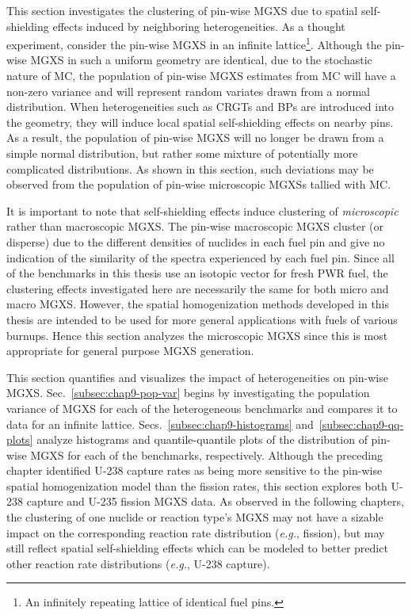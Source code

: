 This section investigates the clustering of pin-wise \ac{MGXS} due to spatial self-shielding effects induced by neighboring heterogeneities. As a thought experiment, consider the pin-wise \ac{MGXS} in an infinite lattice\footnote{An infinitely repeating lattice of identical fuel pins.}. Although the pin-wise \ac{MGXS} in such a uniform geometry are identical, due to the stochastic nature of \ac{MC}, the population of pin-wise \ac{MGXS} estimates from \ac{MC} will have a non-zero variance and will represent random variates drawn from a normal distribution. When heterogeneities such as \acp{CRGT} and \acp{BP} are introduced into the geometry, they will induce local spatial self-shielding effects on nearby pins. As a result, the population of pin-wise \ac{MGXS} will no longer be drawn from a simple normal distribution, but rather some mixture of potentially more complicated distributions. As shown in this section, such deviations may be observed from the population of pin-wise microscopic \acp{MGXS} tallied with \ac{MC}.

It is important to note that self-shielding effects induce clustering of \textit{microscopic} rather than macroscopic \ac{MGXS}. The pin-wise macroscopic \ac{MGXS} cluster (or disperse) due to the different densities of nuclides in each fuel pin and give no indication of the similarity of the spectra experienced by each fuel pin. Since all of the benchmarks in this thesis use an isotopic vector for fresh \ac{PWR} fuel, the clustering effects investigated here are necessarily the same for both micro and macro \ac{MGXS}. However, the spatial homogenization methods developed in this thesis are intended to be used for more general applications with fuels of various burnups. Hence this section analyzes the microscopic \ac{MGXS} since this is most appropriate for general purpose \ac{MGXS} generation.

This section quantifies and visualizes the impact of heterogeneities on pin-wise \ac{MGXS}. Sec.~\ref{subsec:chap9-pop-var} begins by investigating the population variance of \ac{MGXS} for each of the heterogeneous benchmarks and compares it to data for an infinite lattice. Secs.~\ref{subsec:chap9-histograms} and~\ref{subsec:chap9-qq-plots} analyze histograms and quantile-quantile plots of the distribution of pin-wise \ac{MGXS} for each of the benchmarks, respectively. Although the preceding chapter identified U-238 capture rates as being more sensitive to the pin-wise spatial homogenization model than the fission rates, this section explores both U-238 capture and U-235 fission \ac{MGXS} data. As observed in the following chapters, the clustering of one nuclide or reaction type's \ac{MGXS} may not have a sizable impact on the corresponding reaction rate distribution (\textit{e.g.}, fission), but may still reflect spatial self-shielding effects which can be modeled to better predict other reaction rate distributions (\textit{e.g.}, U-238 capture).

